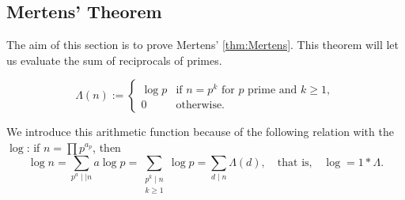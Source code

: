 \subsection{Mertens' Theorem}
The aim of this section is to prove Mertens' \cref{thm:Mertens}.
This theorem will let us evaluate the sum of reciprocals of primes.

\begin{definition}\label{def:von_mangoldt}
    $$
    \Lambda(n) :=
    \begin{cases}
        \log p & \text{if } n = p^k \text{ for $p$ prime and } k \ge 1,\\
        0 & \text{otherwise.}
    \end{cases}
    $$
\end{definition}
We introduce this arithmetic function because of the following relation with the $\log$: if $n = \prod p^{a_p}$, then
\begin{equation}
    \log n= \sum_{p^a \mid \mid n}a \log p
    =\sum_{\substack{p^k \mid n\\ k\ge1} }\log p
    =\sum_{d \mid n } \Lambda(d),
    \quad\text{that is,}\quad \log = 1*\Lambda.
    \label{eq:conv_von_mangold}
\end{equation}

